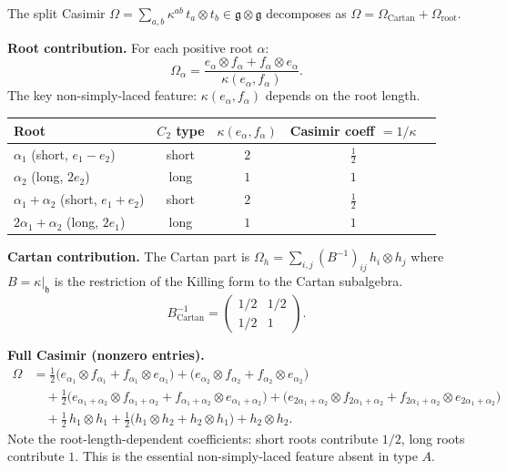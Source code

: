 The split Casimir $\Omega = \sum_{a,b} \kappa^{ab}\, t_a \otimes t_b \in \mathfrak{g} \otimes \mathfrak{g}$
decomposes as $\Omega = \Omega_{\mathrm{Cartan}} + \Omega_{\mathrm{root}}$.

\medskip
\noindent\textbf{Root contribution.}
For each positive root $\alpha$:
\[
 \Omega_\alpha
 = \frac{e_\alpha \otimes f_\alpha + f_\alpha \otimes e_\alpha}{\kappa(e_\alpha, f_\alpha)}.
\]
The key non-simply-laced feature: $\kappa(e_\alpha, f_\alpha)$ depends on the root length.

\begin{center}
\begin{tabular}{lcccc}
\toprule
Root & $C_2$ type & $\kappa(e_\alpha, f_\alpha)$ & Casimir coeff $= 1/\kappa$ \\
\midrule
$\alpha_1$ (short, $e_1{-}e_2$) & short & $2$ & $\tfrac{1}{2}$ \\
$\alpha_2$ (long, $2e_2$) & long & $1$ & $1$ \\
$\alpha_1{+}\alpha_2$ (short, $e_1{+}e_2$) & short & $2$ & $\tfrac{1}{2}$ \\
$2\alpha_1{+}\alpha_2$ (long, $2e_1$) & long & $1$ & $1$ \\
\bottomrule
\end{tabular}
\end{center}

\noindent\textbf{Cartan contribution.} The Cartan part is
$\Omega_h = \sum_{i,j} (B^{-1})_{ij}\, h_i \otimes h_j$
where $B = \kappa|_{\mathfrak{h}}$ is the restriction of the Killing form to
the Cartan subalgebra.
\[
 B^{-1}_{\mathrm{Cartan}}
 = \begin{pmatrix} 1/2 & 1/2 \\ 1/2 & 1 \end{pmatrix}.
\]

\noindent\textbf{Full Casimir (nonzero entries).}
\begin{align*}
 \Omega &= \tfrac{1}{2}\bigl(e_{\alpha_1} \otimes f_{\alpha_1}
 + f_{\alpha_1} \otimes e_{\alpha_1}\bigr)
 + \bigl(e_{\alpha_2} \otimes f_{\alpha_2}
 + f_{\alpha_2} \otimes e_{\alpha_2}\bigr) \\
 &\quad + \tfrac{1}{2}\bigl(e_{\alpha_1{+}\alpha_2} \otimes f_{\alpha_1{+}\alpha_2}
 + f_{\alpha_1{+}\alpha_2} \otimes e_{\alpha_1{+}\alpha_2}\bigr)
 + \bigl(e_{2\alpha_1{+}\alpha_2} \otimes f_{2\alpha_1{+}\alpha_2}
 + f_{2\alpha_1{+}\alpha_2} \otimes e_{2\alpha_1{+}\alpha_2}\bigr) \\
 &\quad + \tfrac{1}{2}\, h_1 \otimes h_1
 + \tfrac{1}{2}\bigl(h_1 \otimes h_2 + h_2 \otimes h_1\bigr)
 + h_2 \otimes h_2.
\end{align*}
Note the root-length-dependent coefficients: short roots contribute $1/2$,
long roots contribute $1$.
This is the essential non-simply-laced feature absent in type $A$.

